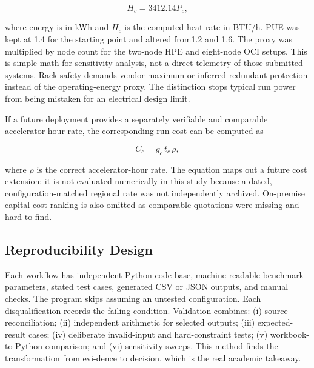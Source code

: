 \documentclass[final,3p,12pt,nopreprintline]{elsarticle}
\begin{document}
\begin{equation}H_c=3412.14P_c,\end{equation}

where energy is in kWh and $H_c$ is the computed heat rate in BTU/h. PUE was kept at 1.4 for the starting point and altered from1.2 and 1.6. The proxy was multiplied by node count for the two-node HPE and eight-node OCI setups. This is simple math for sensitivity analysis, not a direct telemetry of those submitted systems. Rack safety demands vendor maximum or inferred redundant protection instead of the operating-energy proxy. The distinction stops typical run power from being mistaken for an electrical design limit.


If a future deployment provides a separately verifiable and comparable accelerator-hour rate, the corresponding run cost can be computed as


\begin{equation}C_c=g_c\,t_c\,\rho,\end{equation}

where \ensuremath{\rho} is the correct accelerator-hour rate. The equation maps out a future cost extension; it is not evaluated numerically in this study because a dated, configuration-matched regional rate was not independently archived. On-premise capital-cost ranking is also omitted as comparable quotations were missing and hard to find.


\subsection{Reproducibility Design}


Each workflow has independent Python code base, machine-readable benchmark parameters, stated test cases, generated CSV or JSON outputs, and manual checks. The program skips assuming an untested configuration. Each disqualification records the failing condition. Validation combines: (i) source reconciliation; (ii) independent arithmetic for selected outputs; (iii) expected-result cases; (iv) deliberate invalid-input and hard-constraint tests; (v) workbook-to-Python comparison; and (vi) sensitivity sweeps. This method finds the transformation from evi-dence to decision, which is the real academic takeaway.
\end{document}
